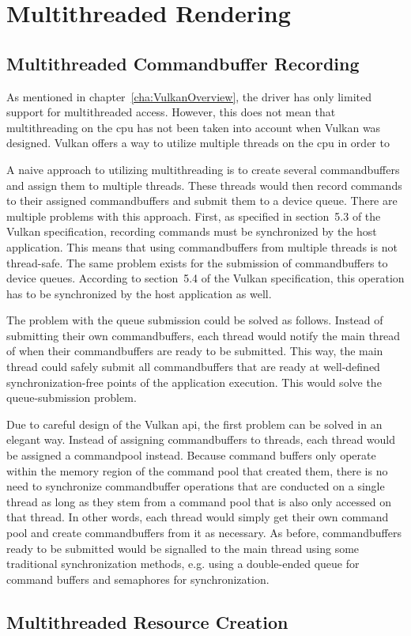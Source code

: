 

  \section{Multithreaded Rendering}
  \label{sec:MultithreadedRendering}
    \tbd

    \subsection{Multithreaded Commandbuffer Recording}

      As mentioned in chapter~\ref{cha:VulkanOverview}, the \gls{driver} has only limited support for multithreaded access. However, this does not mean that multithreading on the \gls{cpu} has not been taken into account when Vulkan was designed. Vulkan offers a way to utilize multiple threads on the \gls{cpu} in order to

      A naive approach to utilizing multithreading is to create several commandbuffers and assign them to multiple threads. These threads would then record commands to their assigned commandbuffers and submit them to a device queue. There are multiple problems with this approach. First, as specified in section~5.3 of the Vulkan specification\cite{vkspec}, recording commands must be synchronized by the host application. This means that using commandbuffers from multiple threads is not thread-safe. The same problem exists for the submission of commandbuffers to device queues. According to section~5.4 of the Vulkan specification, this operation has to be synchronized by the host application as well.

      The problem with the queue submission could be solved as follows. Instead of submitting their own commandbuffers, each thread would notify the main thread of when their commandbuffers are ready to be submitted. This way, the main thread could safely submit all commandbuffers that are ready at well-defined synchronization-free points of the application execution. This would solve the queue-submission problem.

      Due to careful design of the Vulkan \gls{api}, the first problem can be solved in an elegant way. Instead of assigning commandbuffers to threads, each thread would be assigned a commandpool instead. Because command buffers only operate within the memory region of the command pool that created them, there is no need to synchronize commandbuffer operations that are conducted on a single thread as long as they stem from a command pool that is also only accessed on that thread. In other words, each thread would simply get their own command pool and create commandbuffers from it as necessary. As before, commandbuffers ready to be submitted would be signalled to the main thread using some traditional synchronization methods, e.g. using a double-ended queue for command buffers and semaphores for synchronization.

    \subsection{Multithreaded Resource Creation}
      \tbd
